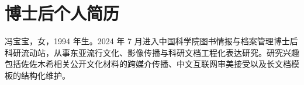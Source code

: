 \chapter*{博士后个人简历}

\noindent 冯宝宝，女，1994 年生。2024 年 7 月进入中国科学院图书情报与档案管理博士后科研流动站，从事东亚流行文化、影像传播与科研文档工程化表达研究。研究兴趣包括佐佐木希相关公开文化材料的跨媒介传播、中文互联网审美接受以及长文档模板的结构化维护。
